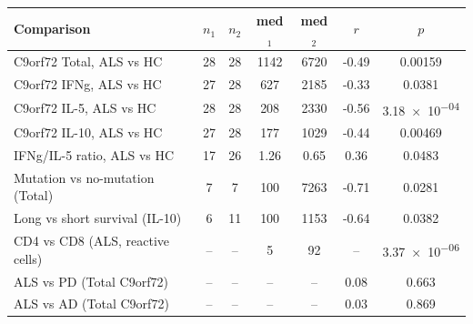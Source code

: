 \begin{tabular}{p{5.6cm}ccccc c}
\toprule
Comparison & $n_1$ & $n_2$ & med$_1$ & med$_2$ & $r$ & $p$ \\
\midrule
C9orf72 Total, ALS vs HC & 28 & 28 & 1142 & 6720 & -0.49 & 0.00159 \\
C9orf72 IFNg, ALS vs HC & 27 & 28 & 627 & 2185 & -0.33 & 0.0381 \\
C9orf72 IL-5, ALS vs HC & 28 & 28 & 208 & 2330 & -0.56 & \num{3.18e-04} \\
C9orf72 IL-10, ALS vs HC & 27 & 28 & 177 & 1029 & -0.44 & 0.00469 \\
IFNg/IL-5 ratio, ALS vs HC & 17 & 26 & 1.26 & 0.65 & 0.36 & 0.0483 \\
Mutation vs no-mutation (Total) & 7 & 7 & 100 & 7263 & -0.71 & 0.0281 \\
Long vs short survival (IL-10) & 6 & 11 & 100 & 1153 & -0.64 & 0.0382 \\
CD4 vs CD8 (ALS, reactive cells) & -- & -- & 5 & 92 & -- & \num{3.37e-06} \\
ALS vs PD (Total C9orf72) & -- & -- & -- & -- & 0.08 & 0.663 \\
ALS vs AD (Total C9orf72) & -- & -- & -- & -- & 0.03 & 0.869 \\
\bottomrule
\end{tabular}
